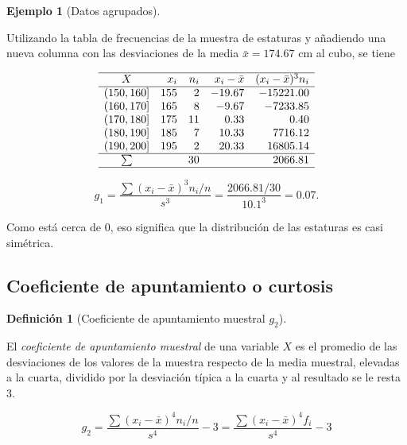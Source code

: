 \documentclass[
  spanish,
  a4paper,
]{scrreport}
\theoremstyle{plain}
\theoremstyle{definition}
\newtheorem{example}{Ejemplo}[chapter]
\theoremstyle{definition}
\newtheorem{definition}{Definición}[chapter]
\theoremstyle{remark}
\begin{document}
\begin{example}[Datos
agrupados]\protect\hypertarget{exm-coeficiente-asimetria}{}\label{exm-coeficiente-asimetria}

Utilizando la tabla de frecuencias de la muestra de estaturas y
añadiendo una nueva columna con las desviaciones de la media
\(\bar x = 174.67\) cm al cubo, se tiene

\[
\begin{array}{crrrr}
\hline
X & x_i & n_i & x_i-\bar x & (x_i-\bar x)^3 n_i \\
\hline
(150,160] & 155 & 2 & -19.67 & -15221.00\\
(160,170] & 165 & 8 & -9.67 & -7233.85\\
(170,180] & 175 & 11 & 0.33 & 0.40\\
(180,190] & 185 & 7 & 10.33 & 7716.12\\
(190,200] & 195 & 2 & 20.33 & 16805.14\\
\hline
\sum &  & 30 & & 2066.81 \\
\hline
\end{array}
\]

\[g_1 = \frac{\sum (x_i-\bar x)^3n_i/n}{s^3} = \frac{2066.81/30}{10.1^3} = 0.07.\]

Como está cerca de 0, eso significa que la distribución de las estaturas
es casi simétrica.

\end{example}

\subsection{Coeficiente de apuntamiento o
curtosis}\label{coeficiente-de-apuntamiento-o-curtosis}

\begin{definition}[Coeficiente de apuntamiento muestral
\(g_2\)]\protect\hypertarget{def-coeficiente-apuntamiento}{}\label{def-coeficiente-apuntamiento}

El \emph{coeficiente de apuntamiento muestral} de una variable \(X\) es
el promedio de las desviaciones de los valores de la muestra respecto de
la media muestral, elevadas a la cuarta, dividido por la desviación
típica a la cuarta y al resultado se le resta 3.

\[g_2 = \frac{\sum (x_i-\bar x)^4 n_i/n}{s^4}-3 = \frac{\sum (x_i-\bar x)^4 f_i}{s^4}-3\]

\end{definition}
\end{document}
